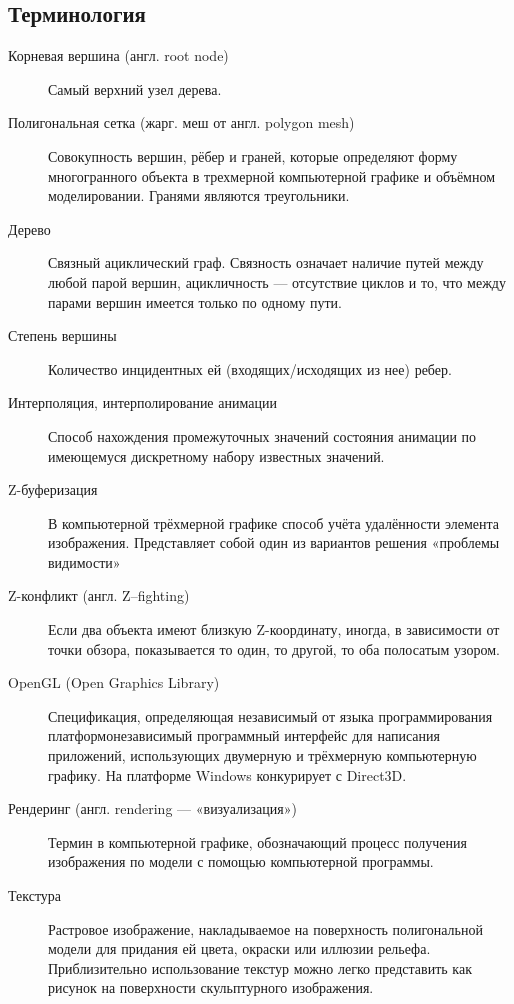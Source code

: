 \subsection{Терминология}
\begin{description}

\item[Корневая вершина (англ. root node)]  
Самый верхний узел дерева.

\item[Полигональная сетка (жарг. меш от англ. polygon mesh)]
Совокупность вершин, рёбер и граней, которые определяют форму многогранного объекта в трехмерной компьютерной графике и объёмном моделировании. Гранями являются треугольники.

\item[Дерево]
Связный ациклический граф. Связность означает наличие путей между любой парой вершин, ацикличность — отсутствие циклов и то, что между парами вершин имеется только по одному пути.

\item[Степень вершины]
Количество инцидентных ей (входящих/исходящих из нее) ребер.

\item[Интерполяция, интерполирование анимации]
Способ нахождения промежуточных значений состояния анимации по имеющемуся дискретному набору известных значений.

\item[Z-буферизация]
В компьютерной трёхмерной графике способ учёта удалённости элемента изображения. Представляет собой один из вариантов решения «проблемы видимости»

\item[Z-конфликт (англ. Z–fighting)]
Если два объекта имеют близкую Z-координату, иногда, в зависимости от точки обзора, показывается то один, то другой, то оба полосатым узором.

\item[OpenGL (Open Graphics Library)]
Спецификация, определяющая независимый от языка программирования платформонезависимый программный интерфейс для написания приложений, использующих двумерную и трёхмерную компьютерную графику. На платформе Windows конкурирует с Direct3D.

\item[Рендеринг (англ. rendering — «визуализация»)]
Термин в компьютерной графике, обозначающий процесс получения изображения по модели с помощью компьютерной программы.

\item[Текстура]
Растровое изображение, накладываемое на поверхность полигональной модели для придания ей цвета, окраски или иллюзии рельефа. Приблизительно использование текстур можно легко представить как рисунок на поверхности скульптурного изображения.

\end{description}

